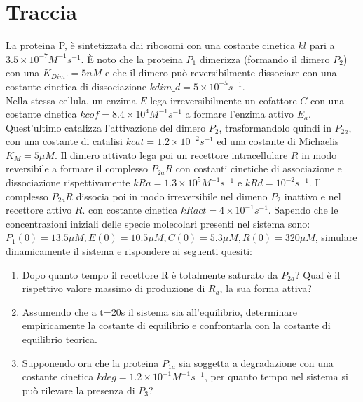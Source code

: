 \documentclass{article}
\begin{document}
\section*{Traccia}
La proteina P, è sintetizzata dai ribosomi con una costante cinetica $kl$ pari a$ 3.5 \times 10^{-7} M^{-1}s^{-1}$. È noto che la proteina $P_1$ dimerizza (formando il dimero $P_2$) con una $K_{Dim}. = 5 nM$ e che il dimero può reversibilmente dissociare con una costante cinetica di dissociazione $kdim\_d = 5 \times 10^{-5}s^{-1}$.\\ Nella stessa cellula, un enzima $E$ lega irreversibilmente un cofattore $C$ con una costante cinetica $kcof = 8.4 \times 10^4 M^{-1}s^{-1}$ a formare l'enzima attivo $E_a$. 
Quest'ultimo catalizza l'attivazione del dimero $P_2$, trasformandolo quindi in $P_{2a}$, con una costante di catalisi $kcat = 1.2 \times 10^{-2}s^{-1}$ ed una costante di Michaelis $K_M = 5 \mu M$. Il dimero attivato lega poi un recettore intracellulare $R$ in modo reversibile a formare il complesso $P_{2a}R$ con costanti cinetiche di associazione e dissociazione rispettivamente $kRa = 1.3 \times 10^5 M^{-1}s^{-1}$ e $kRd =10^{-2} s^{-1}$. Il complesso $P_{2a}R$ dissocia poi in modo irreversibile nel dimeno $P_2$ inattivo e nel recettore attivo $R$. con costante cinetica $kRact = 4 \times 10^{-1}s^{-1} $. 
Sapendo che le concentrazioni iniziali delle specie molecolari presenti nel sistema sono: 
$P_1(0) = 13.5 \mu M, E(0) = 10.5 \mu M, C(0) = 5.3 \mu M, R(0) = 320 \mu M$, simulare dinamicamente il sistema e rispondere ai seguenti quesiti: 
\begin{enumerate}
   \item Dopo quanto tempo il recettore R è totalmente saturato da $P_{2a}$? Qual è il rispettivo valore massimo di produzione di $R_a$, la sua forma attiva?
   \item Assumendo che a t=20s il sistema sia all'equilibrio, determinare empiricamente la costante di equilibrio e confrontarla con la costante di equilibrio teorica.
   \item Supponendo ora che la proteina $P_{1a}$ sia soggetta a degradazione con una costante cinetica $kdeg=1.2 \times 10^{-1} M^{-1}s^{-1}$, per quanto tempo nel sistema si può rilevare la presenza di $P_3$?
\end{enumerate}
\end{document}
